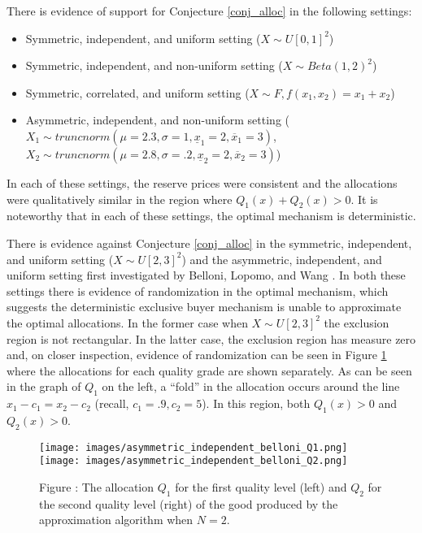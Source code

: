 There is evidence of support for Conjecture \ref{conj_alloc} in the following settings:
\begin{itemize}
    \item Symmetric, independent, and uniform setting ($X \sim U[0,1]^2$)
    \item Symmetric, independent, and non-uniform setting ($X \sim Beta(1,2)^2$)
    \item Symmetric, correlated, and uniform setting ($X \sim F, f(x_1,x_2) = x_1 + x_2$)
    \item Asymmetric, independent, and non-uniform setting ($X_1 \sim truncnorm(\mu=2.3, \sigma=1, \underline{x}_1=2, \overline{x}_1=3)$, $X_2 \sim truncnorm(\mu=2.8, \sigma=.2, \underline{x}_2=2, \overline{x}_2=3)$)
\end{itemize}
\noindent In each of these settings, the reserve prices were consistent and the allocations were qualitatively similar in the region where $Q_1(x) + Q_2(x) > 0$. It is noteworthy that in each of these settings, the optimal mechanism is deterministic. 

There is evidence against Conjecture \ref{conj_alloc} in the symmetric, independent, and uniform setting ($X \sim U[2,3]^2$) and the asymmetric, independent, and uniform setting first investigated by Belloni, Lopomo, and Wang \autocite*{belloni2010multidimensional}. In both these settings there is evidence of randomization in the optimal mechanism, which suggests the deterministic exclusive buyer mechanism is unable to approximate the optimal allocations. In the former case when $X \sim U[2,3]^2$ the exclusion region is not rectangular. In the latter case, the exclusion region has measure zero and, on closer inspection, evidence of randomization can be seen in Figure \ref{fig:belloni_alloc_Q1} where the allocations for each quality grade are shown separately. As can be seen in the graph of $Q_1$ on the left, a ``fold'' in the allocation occurs around the line $x_1 - c_1 = x_2 - c_2$ (recall, $c_1=.9, c_2=5$). In this region, both $Q_1(x) > 0$ and $Q_2(x) > 0$.


\begin{figure}[H]
    \begin{center}
    \texttt{[image: images/asymmetric\_independent\_belloni\_Q1.png]}
    \texttt{[image: images/asymmetric\_independent\_belloni\_Q2.png]}
    \end{center}
    
    \vspace{1mm}
    \raggedright{\small {\sc Figure \thefig\label{fig:belloni_alloc_Q1}:} The allocation $Q_1$ for the first quality level (left) and $Q_2$ for the second quality level (right) of the good produced by the approximation algorithm when $N=2$.} 
\end{figure}

